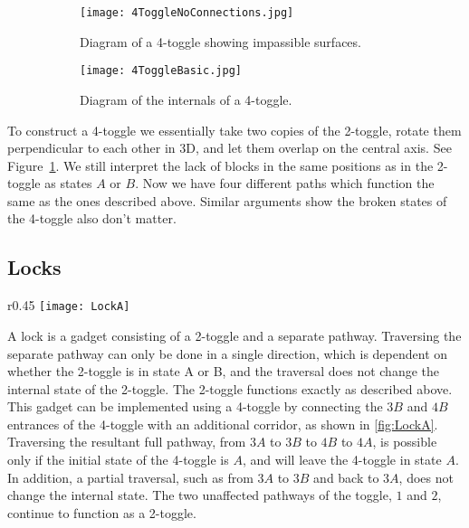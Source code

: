 \begin{figure}[!ht]
  \centering
  \begin{subfigure}[t]{\textwidth}
    \texttt{[image: 4ToggleNoConnections.jpg]}
    \caption{Diagram of a 4-toggle showing impassible surfaces.}
    \label{fig:4Toggle3D}
  \end{subfigure}
  \hfill
  \begin{subfigure}[t]{\textwidth}
    \texttt{[image: 4ToggleBasic.jpg]}
    \caption{Diagram of the internals of a 4-toggle.}
    \label{fig:4Toggle3DBasic}
  \end{subfigure}
  \caption{}
\end{figure}

To construct a 4-toggle we essentially take two copies of the 2-toggle, rotate them perpendicular to each other in 3D, and let them overlap on the central axis. See Figure~\ref{fig:4Toggle3D}. We still interpret the lack of blocks in the same positions as in the 2-toggle as states $A$ or $B$. Now we have four different paths which function the same as the ones described above. Similar arguments show the broken states of the 4-toggle also don't matter.

\subsection{Locks}

\begin{wrapfigure}{r}{0.45\textwidth}
  \centering
    \texttt{[image: LockA]}
    \caption{Diagram of a lock. The $1a$ to $2a$ traversal is only possible in state $A$ and returns the toggle to state $A$.}
    \label{fig:LockA}
\end{wrapfigure}

A lock is a gadget consisting of a 2-toggle and a separate pathway. Traversing the separate pathway can only be done in a single direction, which is dependent on whether the 2-toggle is in state A or B, and the traversal does not change the internal state of the 2-toggle. The 2-toggle functions exactly
as described above. This gadget can be implemented using a 4-toggle by
connecting the $3B$ and $4B$ entrances of the 4-toggle with an additional corridor, as shown in \ref{fig:LockA}.
Traversing the resultant full pathway, from $3A$ to $3B$ to $4B$ to $4A$, is possible only if the initial
state of the 4-toggle is $A$, and will leave the 4-toggle in state $A$. In addition, a partial traversal,
such as from $3A$ to $3B$ and back to $3A$, does not change the internal state. The two unaffected
pathways of the toggle, $1$ and $2$, continue to function as a 2-toggle.

